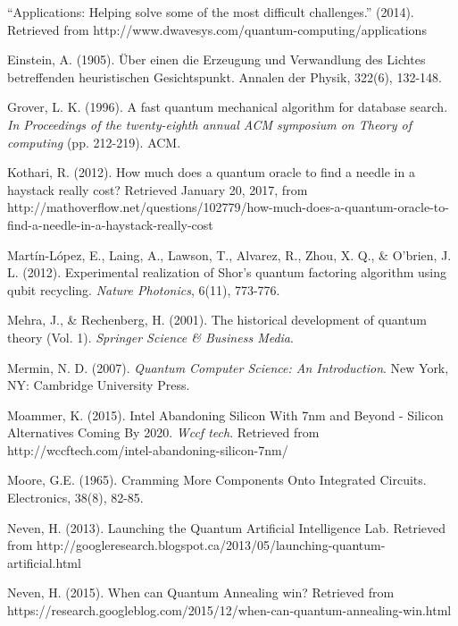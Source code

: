\documentclass[11pt]{report}
\newcommand{\?}{\stackrel{?}{=}}
\begin{document}
\begin{thebibliography}{9}
\raggedright
  
  “Applications: Helping solve some of the most difficult challenges.” (2014). Retrieved from http://www.dwavesys.com/quantum-computing/applications
  
  Einstein, A. (1905). Über einen die Erzeugung und Verwandlung des Lichtes betreffenden heuristischen Gesichtspunkt. Annalen der Physik, 322(6), 132-148.

  Grover, L. K. (1996). A fast quantum mechanical algorithm for database search. \emph{In Proceedings of the twenty-eighth annual ACM symposium on Theory of computing} (pp. 212-219). ACM.

  Kothari, R. (2012). How much does a quantum oracle to find a needle in a haystack really cost? Retrieved January 20, 2017, from http://mathoverflow.net/questions/102779/how-much-does-a-quantum-oracle-to-find-a-needle-in-a-haystack-really-cost

  Martín-López, E., Laing, A., Lawson, T., Alvarez, R., Zhou, X. Q., \& O'brien, J. L. (2012). Experimental realization of Shor's quantum factoring algorithm using qubit recycling. \emph{Nature Photonics}, 6(11), 773-776.

  Mehra, J., \& Rechenberg, H. (2001). The historical development of quantum theory (Vol. 1). \emph{Springer Science \& Business Media}.
  
  Mermin, N. D. (2007). \emph{Quantum Computer Science: An Introduction}. New York, NY: Cambridge University Press.

  Moammer, K. (2015). Intel Abandoning Silicon With 7nm and Beyond - Silicon Alternatives Coming By 2020. \emph{Wccf tech}. Retrieved from http://wccftech.com/intel-abandoning-silicon-7nm/

  Moore, G.E. (1965). Cramming More Components Onto Integrated Circuits. Electronics, 38(8), 82-85.

  Neven, H. (2013). Launching the Quantum Artificial Intelligence Lab. Retrieved from http://googleresearch.blogspot.ca/2013/05/launching-quantum-artificial.html
  
  Neven, H. (2015). When can Quantum Annealing win? Retrieved from https://research.googleblog.com/2015/12/when-can-quantum-annealing-win.html  
  

\end{thebibliography}
\end{document}
